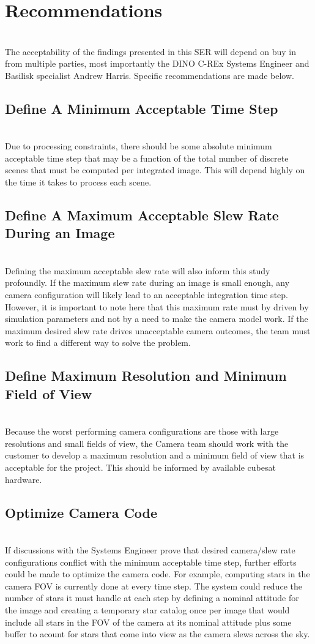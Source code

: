 \documentclass[]{DINOReportMemo}
\begin{document}
\section{Recommendations}  \\
The acceptability of the findings presented in this SER will depend on buy in from multiple parties, most importantly the DINO C-REx Systems Engineer and Basilisk specialist Andrew Harris. Specific recommendations are made below.
    \subsection{Define A Minimum Acceptable Time Step} \\Due to processing constraints, there should be some absolute minimum acceptable time step that may be a function of the total number of discrete scenes that must be computed per integrated image. This will depend highly on the time it takes to process each scene.
    \subsection{Define A Maximum Acceptable Slew Rate During an Image} \\
    Defining the maximum acceptable slew rate will also inform this study profoundly. If the maximum slew rate during an image is small enough, any camera configuration will likely lead to an acceptable integration time step. However, it is important to note here that this maximum rate must by driven by simulation parameters and not by a need to make the camera model work. If the maximum desired slew rate drives unacceptable camera outcomes, the team must work to find a different way to solve the problem.
    \subsection{Define Maximum Resolution and Minimum Field of View}\\
    Because the worst performing camera configurations are those with large resolutions and small fields of view, the Camera team should work with the customer to develop a maximum resolution and a minimum field of view that is acceptable for the project. This should be informed by available cubesat hardware.
    \subsection{Optimize Camera Code}\\
    If discussions with the Systems Engineer prove that desired camera/slew rate configurations conflict with the minimum acceptable time step, further efforts could be made to optimize the camera code. For example, computing stars in the camera FOV is currently done at every time step. The system could reduce the number of stars it must handle at each step by defining a nominal attitude for the image and creating a temporary star catalog once per image that would include all stars in the FOV of the camera at its nominal attitude plus some buffer to acount for stars that come into view as the camera slews across the sky.
\end{document}
